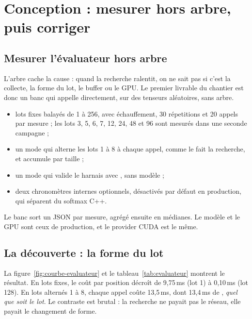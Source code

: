 \section{Conception : mesurer hors arbre, puis corriger}

\subsection{Mesurer l'\'evaluateur hors arbre}

L'arbre cache la cause : quand la recherche ralentit, on ne sait pas si c'est
la collecte, la forme du lot, le buffer ou le GPU. Le premier livrable du
chantier est donc un banc qui appelle  directement, sur
des tenseurs al\'eatoires, sans arbre.

\begin{mesure}
\begin{itemize}[leftmargin=1.2em,itemsep=2pt]
  \item lots fixes balay\'es de 1 \`a 256, avec \'echauffement, 30
  r\'epetitions et 20 appels par mesure ; les lots 3, 5, 6, 7, 12, 24, 48 et
  96 sont mesur\'es dans une seconde campagne ;
  \item un mode  qui alterne les lots 1 \`a 8 \`a chaque
  appel, comme le fait la recherche, et accumule par taille ;
  \item un mode  qui valide le harnais avec
  , sans mod\`ele ;
  \item deux chronom\`etres internes optionnels, d\'esactiv\'es par d\'efaut en
  production, qui s\'eparent  du softmax C++.
\end{itemize}
\end{mesure}

Le banc sort un JSON par mesure, agr\'eg\'e ensuite en m\'edianes. Le mod\`ele
et le GPU sont ceux de production, et le provider CUDA est le m\^eme.

\subsection{La d\'ecouverte : la forme du lot}

La figure~\ref{fig:courbe-evaluateur} et le tableau~\ref{tab:evaluateur}
montrent le r\'esultat. En lots fixes, le co\^ut par position d\'ecro\^it de
9,75\,ms (lot 1) \`a 0,10\,ms (lot 128). En lots altern\'es 1 \`a 8, chaque
appel co\^ute 13,5\,ms, dont 13,4\,ms de , \emph{quel que
soit le lot}. Le contraste est brutal : la recherche ne payait pas le r\'eseau,
elle payait le changement de forme.

